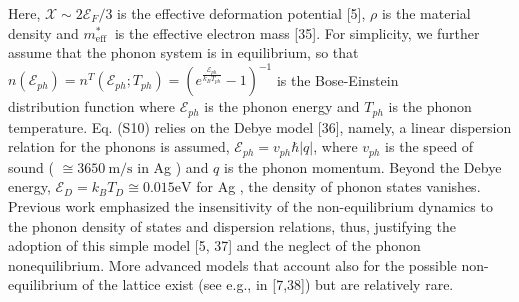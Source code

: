 \documentclass[10pt]{article}
\begin{document}
Here, $\mathcal{X} \sim 2 \mathcal{E}_{F} / 3$ is the effective deformation potential [5], $\rho$ is the material density and $m_{\text {eff }}^{*}$ is the effective electron mass [35]. For simplicity, we further assume that the phonon system is in equilibrium, so that $n\left(\mathcal{E}_{p h}\right)=n^{T}\left(\mathcal{E}_{p h} ; T_{p h}\right)=\left(e^{\frac{\mathcal{E}_{p h}}{k_{B} T_{p h}}}-1\right)^{-1}$ is the Bose-Einstein\\
distribution function where $\mathcal{E}_{p h}$ is the phonon energy and $T_{p h}$ is the phonon temperature. Eq. (S10) relies on the Debye model [36], namely, a linear dispersion relation for the phonons is assumed, $\mathcal{E}_{p h}=v_{p h} \hbar|q|$, where $v_{p h}$ is the speed of sound ( $\cong 3650 \mathrm{~m} / \mathrm{s}$ in Ag ) and $q$ is the phonon momentum. Beyond the Debye energy, $\mathcal{E}_{D}=k_{B} T_{D} \cong 0.015 \mathrm{eV}$ for Ag , the density of phonon states vanishes. Previous work emphasized the insensitivity of the non-equilibrium dynamics to the phonon density of states and dispersion relations, thus, justifying the adoption of this simple model [5, 37] and the neglect of the phonon nonequilibrium. More advanced models that account also for the possible non-equilibrium of the lattice exist (see e.g., in [7,38]) but are relatively rare.
\end{document}
